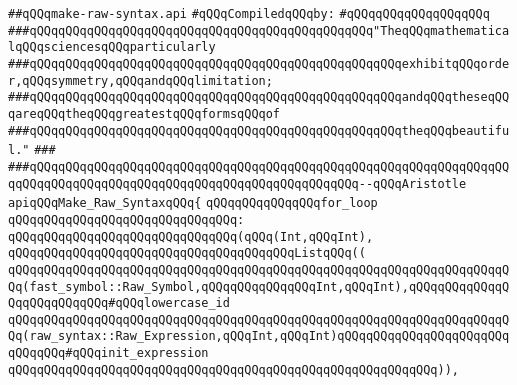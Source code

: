 \label{src/lib/compiler/front/parser/raw-syntax/make-raw-syntax.api}
\verb|##qQQqmake-raw-syntax.api|\newline
\newline
\verb|#qQQqCompiledqQQqby:|\newline
\verb|#qQQqqQQqqQQqqQQqqQQq|\newline
\newline
\newline
\newline
\verb|###qQQqqQQqqQQqqQQqqQQqqQQqqQQqqQQqqQQqqQQqqQQqqQQq"TheqQQqmathematicalqQQqsciencesqQQqparticularly|\newline
\verb|###qQQqqQQqqQQqqQQqqQQqqQQqqQQqqQQqqQQqqQQqqQQqqQQqqQQqexhibitqQQqorder,qQQqsymmetry,qQQqandqQQqlimitation;|\newline
\verb|###qQQqqQQqqQQqqQQqqQQqqQQqqQQqqQQqqQQqqQQqqQQqqQQqqQQqandqQQqtheseqQQqareqQQqtheqQQqgreatestqQQqformsqQQqof|\newline
\verb|###qQQqqQQqqQQqqQQqqQQqqQQqqQQqqQQqqQQqqQQqqQQqqQQqqQQqtheqQQqbeautiful."|\newline
\verb|###|\newline
\verb|###qQQqqQQqqQQqqQQqqQQqqQQqqQQqqQQqqQQqqQQqqQQqqQQqqQQqqQQqqQQqqQQqqQQqqQQqqQQqqQQqqQQqqQQqqQQqqQQqqQQqqQQqqQQqqQQqqQQq--qQQqAristotle|\newline
\newline
\newline
\newline
\verb|apiqQQqMake_Raw_SyntaxqQQq{|\newline
\newline
\verb|qQQqqQQqqQQqqQQqfor_loop|\newline
\verb|qQQqqQQqqQQqqQQqqQQqqQQqqQQqqQQq:|\newline
\verb|qQQqqQQqqQQqqQQqqQQqqQQqqQQqqQQq(qQQq(Int,qQQqInt),|\newline
\verb|qQQqqQQqqQQqqQQqqQQqqQQqqQQqqQQqqQQqqQQqListqQQq((|\newline
\verb|qQQqqQQqqQQqqQQqqQQqqQQqqQQqqQQqqQQqqQQqqQQqqQQqqQQqqQQqqQQqqQQqqQQqqQQq(fast_symbol::Raw_Symbol,qQQqqQQqqQQqqQQqInt,qQQqInt),qQQqqQQqqQQqqQQqqQQqqQQqqQQq#qQQqlowercase_id|\newline
\verb|qQQqqQQqqQQqqQQqqQQqqQQqqQQqqQQqqQQqqQQqqQQqqQQqqQQqqQQqqQQqqQQqqQQqqQQq(raw_syntax::Raw_Expression,qQQqInt,qQQqInt)qQQqqQQqqQQqqQQqqQQqqQQqqQQqqQQq#qQQqinit_expression|\newline
\verb|qQQqqQQqqQQqqQQqqQQqqQQqqQQqqQQqqQQqqQQqqQQqqQQqqQQqqQQqqQQq)),|\newline
